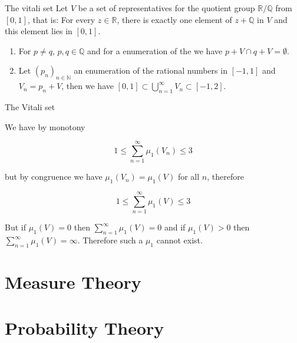 \documentclass{beamer}
\newcommand{\RR}{\mathbb{R}}
\newcommand{\QQ}{\mathbb{Q}}
\newcommand{\NN}{\mathbb{N}}
\begin{document}
\begin{frame}{The vitali set}
  Let $V$ be a set of representatives for the quotient group $\RR/\QQ$
  from $[0,1]$, that is: For every $z \in \RR$, there is exactly one
  element of $z+\QQ$ in $V$ and this element lies in $[0,1]$.

  \begin{lemma}
    \begin{enumerate}
    \item For $p\neq q$, $p,q\in\QQ$ and for a enumeration of the we
      have $p+V \cap q+V = \emptyset$.
    \item Let $(p_n)_{n\in\NN}$ an enumeration of the rational numbers
      in $[-1,1]$ and $V_n=p_n + V$, then we have $[0,1] \subset
      \bigcup_{n=1}^{\infty} V_n \subset [-1, 2]$.
    \end{enumerate}
  \end{lemma}
\end{frame}

\begin{frame}{The Vitali set}

  We have by monotony
  
  \[1 \leq \sum_{n=1}^\infty \mu_1(V_n) \leq 3\]

  but by congruence we have $\mu_1(V_n) = \mu_1(V)$ for all $n$, therefore

  \[1 \leq \sum_{n=1}^\infty \mu_1(V) \leq 3\]

  But if $\mu_1(V)=0$ then $\sum_{n=1}^\infty \mu_1(V)=0$ and if
  $\mu_1(V)>0$ then $\sum_{n=1}^\infty \mu_1(V) = \infty$. Therefore
  such a $\mu_1$ cannot exist.

\end{frame}


\section{Measure Theory}

\section{Probability Theory}
\end{document}
